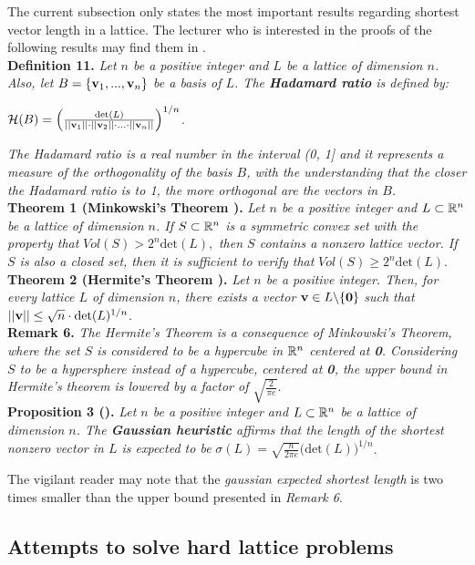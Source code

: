 The current subsection only states the most important results regarding shortest vector length in a lattice. The lecturer who is interested in the proofs of the following results may find them in \cite{HPS08}.\\

\textbf{Definition 11.} \textit{Let $n$ be a positive integer and $L$ be a lattice of dimension $n$. Also, let} $B = \{\textbf{v}_1,...,\textbf{v}_n\}$ \textit{be a basis of $L$. The \textbf{Hadamard ratio} is defined by:}
\begin{center}
	$\mathcal{H}(B) = \Big(\frac{\text{det}(L)}{||\textbf{v}_1|| \cdot ||\textbf{v}_2|| \cdot ... \cdot ||\textbf{v}_n||} \Big)^{1/n}$.
\end{center}
\textit{The Hadamard ratio is a real number in the interval (0, 1] and it represents a measure of the orthogonality of the basis $B$, with the understanding that the closer the Hadamard ratio is to 1, the more orthogonal are the vectors in $B$.}\\

\textbf{Theorem 1 (Minkowski's Theorem \cite{HPS08}).} \textit{Let $n$ be a positive integer and $L\subset \mathbb{R}^n$ be a lattice of dimension $n$. If $S \subset \mathbb{R}^n$ is a symmetric convex set with the property that} $Vol(S) > 2^n \text{det}(L),$ \textit{then $S$ contains a nonzero lattice vector. If $S$ is also a closed set, then it is sufficient to verify that }$Vol(S) \geq 2^n \text{det}(L)$. \\

\textbf{Theorem 2 (Hermite's Theorem \cite{HPS08}).} \textit{Let $n$ be a positive integer. Then, for every lattice $L$ of dimension $n$, there exists a vector} $\textbf{v} \in L \backslash\{\textbf{0}\}$ \textit{such that}  $||\textbf{v}|| \leq \sqrt{n} \cdot \text{det} (L) ^{1/n}$.\\

\textbf{Remark 6.} \textit{The Hermite's Theorem is a consequence of Minkowski's Theorem, where the set $S$ is considered to be a hypercube in $\mathbb{R}^n$ centered at \textbf{0}. Considering $S$ to be a hypersphere instead of a hypercube, centered at \textbf{0}, the upper bound in Hermite's theorem is lowered by a factor of $\sqrt{\frac{2}{\pi e}}$}.\\

\textbf{Proposition 3 (\cite{HPS08}).} \textit{Let $n$ be a positive integer and $L\subset \mathbb{R}^n$ be a lattice of dimension $n$. The \textbf{Gaussian heuristic} affirms that the length of the shortest nonzero vector in $L$ is expected to be} $\sigma(L) = \sqrt{\frac{n}{2\pi e}}\big(\text{det}(L)\big)^{1/n}$.

The vigilant reader may note that the \textit{gaussian expected shortest length} is two times smaller than the upper bound presented in \textit{Remark 6}. \\

\subsection{Attempts to solve hard lattice problems}



